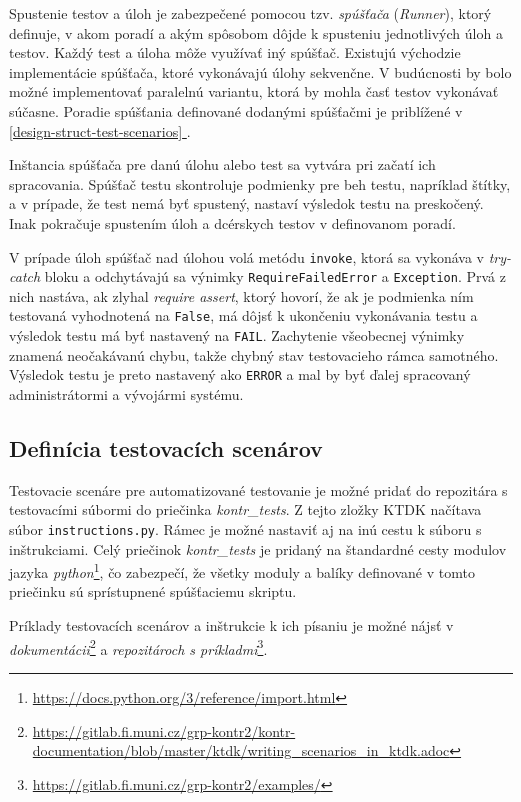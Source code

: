 \documentclass[
  digital, %
  twoside, %
  table,   %
  lof,     %
  lot,     %
]{fithesis3}
\newcommand*{\fullref}[1]{\hyperref[{#1}]{\autoref*{#1} \nameref*{#1}}}
\begin{document}
Spustenie testov a úloh je zabezpečené pomocou tzv. \emph{spúšťača} (\emph{Runner}), ktorý definuje, v akom poradí a akým spôsobom dôjde k spusteniu jednotlivých úloh a testov. Každý test a úloha môže využívať iný spúšťač. Existujú východzie implementácie spúšťača, ktoré vykonávajú úlohy sekvenčne. V budúcnosti by bolo možné implementovať paralelnú variantu, ktorá by mohla časť testov vykonávať súčasne. Poradie spúšťania definované dodanými spúšťačmi je priblížené v \fullref{design-struct-test-scenarios}.

Inštancia spúšťača pre danú úlohu alebo test sa vytvára pri začatí ich spracovania. Spúšťač testu skontroluje podmienky pre beh testu, napríklad štítky, a v prípade, že test nemá byť spustený, nastaví výsledok testu na preskočený. Inak pokračuje spustením úloh a dcérskych testov v definovanom poradí.

V prípade úloh spúšťač nad úlohou volá metódu \texttt{invoke}, ktorá sa vykonáva v \emph{try-catch} bloku a odchytávajú sa výnimky \texttt{RequireFailedError} a \texttt{Exception}. Prvá z nich nastáva, ak zlyhal \emph{require assert}, ktorý hovorí, že ak je podmienka ním testovaná vyhodnotená na \texttt{False}, má dôjsť k ukončeniu vykonávania testu a výsledok testu má byť nastavený na \texttt{FAIL}. Zachytenie všeobecnej výnimky znamená neočakávanú chybu, takže chybný stav testovacieho rámca samotného. Výsledok testu je preto nastavený ako \texttt{ERROR} a mal by byť ďalej spracovaný administrátormi a vývojármi systému.

\subsection{Definícia testovacích scenárov}

Testovacie scenáre pre automatizované testovanie je možné pridať do repozitára s testovacími súbormi do priečinka \emph{kontr\_tests}. Z tejto zložky KTDK načítava súbor \texttt{instructions.py}. Rámec je možné nastaviť aj na inú cestu k súboru s inštrukciami. Celý priečinok \emph{kontr\_tests} je pridaný na štandardné cesty modulov jazyka \emph{python}\footnote{\url{https://docs.python.org/3/reference/import.html}}, čo zabezpečí, že všetky moduly a balíky definované v tomto priečinku sú sprístupnené spúšťaciemu skriptu.

Príklady testovacích scenárov a inštrukcie k ich písaniu je možné nájsť v \emph{dokumentácii}\footnote{\url{https://gitlab.fi.muni.cz/grp-kontr2/kontr-documentation/blob/master/ktdk/writing_scenarios_in_ktdk.adoc}} a \emph{repozitároch s príkladmi}\footnote{\url{https://gitlab.fi.muni.cz/grp-kontr2/examples/}}. 
\end{document}
